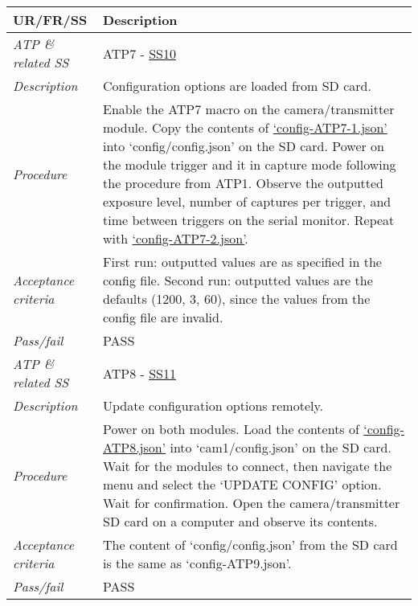 \documentclass[class=report,11pt,crop=false]{standalone}
\begin{document}
\begin{table}[!ht]
    \centering
    \begin{scriptsize}
    \begin{tabularx}{\textwidth}{|p{} X|}
        
        \hline
        \textbf{UR/FR/SS} & \textbf{Description}\\ \hline

        \textit{ATP \& related SS} & ATP7 - \hyperlink{tab:firmware-requirements}{SS10} \\
        \textit{Description} & Configuration options are loaded from SD card.\\
        \textit{Procedure} & Enable the ATP7 macro on the camera/transmitter module. Copy the contents of \href{https://github.com/rothdu/EEE4113F-Group13-2024/blob/main/firmware/json-samples/config-ATP8-1.json}{`config-ATP7-1.json'} into `config/config.json' on the SD card. Power on the module trigger and it in capture mode following the procedure from ATP1. Observe the outputted exposure level, number of captures per trigger, and time between triggers on the serial monitor. Repeat with \href{https://github.com/rothdu/EEE4113F-Group13-2024/blob/main/firmware/json-samples/config-ATP7-2.json}{`config-ATP7-2.json'}. \\
        \textit{Acceptance criteria} & First run: outputted values are as specified in the config file. Second run: outputted values are the defaults (1200, 3, 60), since the values from the config file are invalid.\\ 
        \textit{Pass/fail} & PASS\\ \hline

        \textit{ATP \& related SS} & ATP8 - \hyperlink{tab:firmware-requirements}{SS11}\\
        \textit{Description} & Update configuration options remotely.\\
        \textit{Procedure} & Power on both modules. Load the contents of \href{https://github.com/rothdu/EEE4113F-Group13-2024/blob/main/firmware/json-samples/config-ATP8.json}{`config-ATP8.json'} into `cam1/config.json' on the SD card. Wait for the modules to connect, then navigate the menu and select the `UPDATE CONFIG' option. Wait for confirmation. Open the camera/transmitter SD card on a computer and observe its contents.\\
        \textit{Acceptance criteria} & The content of `config/config.json' from the SD card is the same as `config-ATP9.json'.\\ 
        \textit{Pass/fail} & PASS \\ \hline


\end{tabularx}
\end{scriptsize}
\end{table}
\end{document}
